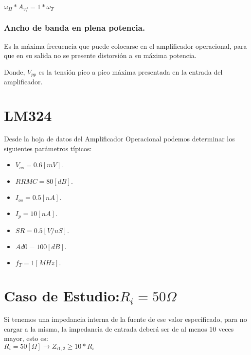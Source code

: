     $\omega_{H}*A_{vf} = 1*\omega_{T}$
    
    \begin{center}
    \end{center}
    
\subsubsection{Ancho de banda en plena potencia.}
    Es la máxima frecuencia que puede colocarse en el amplificador operacional, para que en su salida no se presente distorsión a su máxima potencia.\\

    \begin{center}
    \end{center}

    Donde, $V_{pp}$ es la tensión pico a pico máxima presentada en la entrada del amplificador.\\

\newpage

\section{LM324}
Desde la hoja de datos del Amplificador Operacional podemos determinar los siguientes parámetros típicos:\\
\begin{itemize}
    \item $V_{os} = 0.6 [mV]$.
    \item $RRMC = 80 [dB]$.
    \item $I_{os} = 0.5 [nA].$
    \item $I_{p} = 10 [nA].$
    \item $SR = 0.5 [V/uS].$
    \item $Ad0 = 100 [dB].$
    \item $f_T = 1 [MHz].$
\end{itemize}

\section{Caso de Estudio:$R_{i} = 50 \Omega$ }
Si tenemos una impedancia interna de la fuente de ese valor especificado, para no cargar a la misma, la impedancia de entrada deberá ser de al menos 10 veces mayor, esto es:\\

$R_{i} = 50 [\Omega] \xrightarrow{} Z_{i1,2} \ge 10*R_{i} $\\

